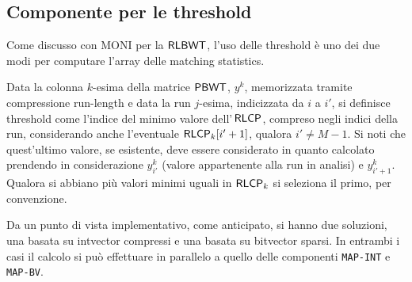 \subsection{Componente per le threshold}
Come discusso con MONI per la $\mbox{\rm {\sf RLBWT}}$, l'uso delle threshold è 
uno dei due modi per computare l'array delle matching statistics. 
\begin{definizione}
  Data la colonna $k$-esima della matrice $\mbox{\rm {\sf PBWT}}$, $y^k$, memorizzata
  tramite compressione run-length e data la run $j$-esima, indicizzata
  da $i$ a $i'$, si definisce threshold come l'indice del minimo valore
  dell'$\,\mbox{\rm {\sf RLCP}}$,
  compreso negli indici della run, considerando anche l'eventuale 
  $\mbox{\rm {\sf RLCP}}_k[i'+1]$, qualora $i'\neq M-1$. Si noti che quest'ultimo valore, se
  esistente, deve essere considerato in quanto calcolato prendendo in
  considerazione $y^k_{i'}$ (valore appartenente alla run in analisi) e
  $y^k_{i'+1}$. \\
  Qualora si abbiano più valori minimi uguali in $\mbox{\rm {\sf RLCP}}_k$ si seleziona il
  primo, per convenzione.
\end{definizione}
Da un punto di vista implementativo, come anticipato, si hanno due soluzioni,
una basata su intvector compressi e una basata su bitvector sparsi. In
entrambi i casi il calcolo si può effettuare in parallelo a quello delle
componenti \texttt{MAP-INT} e \texttt{MAP-BV}.
